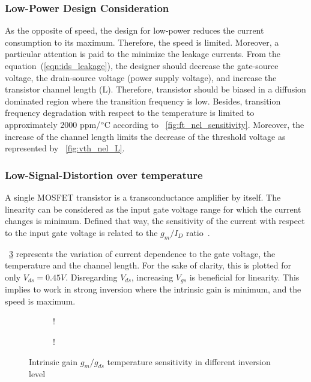 \subsubsection{Low-Power Design Consideration}
As the opposite of speed, the design for low-power reduces the current consumption to its maximum. Therefore, the speed is limited. Moreover, a particular attention is paid to the minimize the leakage currents. From the equation~(\ref{eqn:ids_leakage}), the designer should decrease the gate-source voltage, the drain-source voltage (power supply voltage), and increase the transistor channel length (L). Therefore, transistor should be biased in a diffusion dominated region where the transition frequency is low. Besides, transition frequency degradation with respect to the temperature is limited to approximately 2000 ppm/\(\degree \)C according to \figurename~\ref{fig:ft_nel_sensitivity}. Moreover, the increase of the channel length limits the decrease of the threshold voltage as represented by \figurename~\ref{fig:vth_nel_L}.

\subsubsection{Low-Signal-Distortion over temperature}
A single MOSFET transistor is a transconductance amplifier by itself. The linearity can be considered as the input gate voltage range for which the current changes is minimum. Defined that way, the sensitivity of the current with respect to the input gate voltage is related to the \(g_m/I_D \) ratio~\cite{Ou2018a,Ou2017a}.

\figurename~\ref{fig:gm_id} represents the variation of current dependence to the gate voltage, the temperature and the channel length. For the sake of clarity, this is plotted for only \(V_{ds} = 0.45 V\). Disregarding \(V_{ds}\), increasing \(V_{gs}\) is beneficial for linearity. This implies to work in strong inversion where the intrinsic gain is minimum, and the speed is maximum. 
\begin{figure}[!ht]
	\centering
	\begin{subfigure}[b]{0.48\textwidth}
		\resizebox {\textwidth} {!} { 
			
		}
		\label{fig:gm_nel_T}
	\end{subfigure}
	\begin{subfigure}[b]{0.48\textwidth}
		\resizebox {\textwidth} {!} { 
			
		}
		\label{fig:gm_nel_L}
	\end{subfigure}
	\caption{Intrinsic gain \(g_m/g_{ds} \) temperature sensitivity in different inversion level}
	\label{fig:gm_id}
\end{figure}

